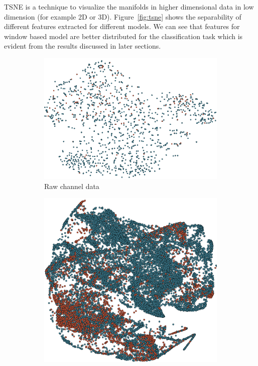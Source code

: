 \documentclass[letterpaper,12pt]{article}
\begin{document}
TSNE is a technique to visualize the manifolds in higher dimensional data in low
dimension (for example 2D or 3D). Figure~\ref{fig:tsne} shows the separability of
different features extracted for different models. We can see that features for
window based model are better distributed for the classification task which is
evident from the results discussed in later sections.

\begin{figure}[] \centering
	\begin{subfigure}[t]{2in} \centering
    \includegraphics[scale=0.2]{images/tsne_raw_data.png}
		\caption{Raw channel data}\label{fig:1a}
	\end{subfigure}
 	\begin{subfigure}[t]{2in} \centering
    \includegraphics[scale=0.2]{images/trad_feat_viz.png}

\end{subfigure}
\end{figure}
\end{document}
